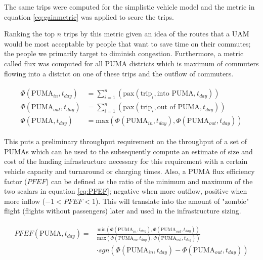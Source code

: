 The same trips were computed for the simplistic vehicle model and the metric in equation \ref{eq:gainmetric} was applied to score the trips.

Ranking the top $n$ trips by this metric given an idea of the routes that a UAM would be most acceptable by people that want to save time on their commutes; the people we primarily target to diminish congestion. Furthermore, a metric called flux was computed for all PUMA districts which is maximum of commuters flowing into a district on one of these trips and the outflow of commuters.

\begin{align} \label{eq:PUMAflux}
    \begin{split}
    \Phi(\text{PUMA}_{in}, t_{day}) &= \sum_{i=1}^n{ \left( \text{pax}(\text{trip}_i, \text{into   PUMA}, t_{day})\right)}\\
    \Phi(\text{PUMA}_{out}, t_{day}) &= \sum_{i=1}^n{ \left( \text{pax}(\text{trip}_i, \text{out of PUMA}, t_{day})\right)}\\
    \Phi(\text{PUMA}, t_{day}) &= \text{max} 
    \left(
        \Phi(\text{PUMA}_{in}, t_{day}),
        \Phi(\text{PUMA}_{out}, t_{day})
    \right)
    \end{split}
\end{align}

This puts a preliminary throughput requirement on the throughput of a set of PUMAs which can be used to the subsequently compute an estimate of size and cost of the landing infrastructure necessary for this requirement with a certain vehicle capacity and turnaround or charging times. Also, a PUMA flux efficiency factor ($PFEF$) can be defined as the ratio of the minimum and maximum of the two scalars in equation \ref{eq:PFEF}; negative when more outflow, positive when more inflow ($-1 < PFEF < 1$). This will translate into the amount of "zombie" flight (flights without passengers) later and used in the infrastructure sizing.

\begin{align} \label{eq:PFEF}
    \begin{split}
        PFEF(\text{PUMA}, t_{day}) = &\frac{\text{min} 
        \left(
            \Phi(\text{PUMA}_{in}, t_{day}),
            \Phi(\text{PUMA}_{out}, t_{day})
        \right)
        }{\text{max} 
        \left(
            \Phi(\text{PUMA}_{in}, t_{day}),
            \Phi(\text{PUMA}_{out}, t_{day})
        \right)
        } \\
        &\cdot sgn ( \Phi(\text{PUMA}_{in}, t_{day}) - \Phi(\text{PUMA}_{out}, t_{day}) )
    \end{split}
\end{align}


